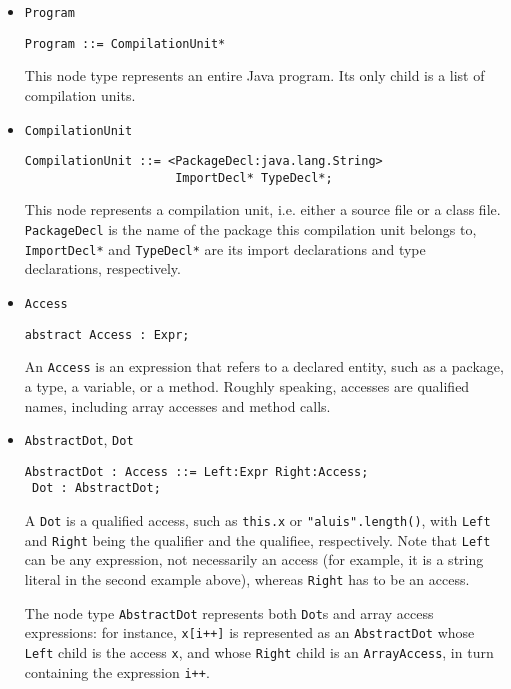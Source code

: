 \documentclass{article}
\newcommand{\nt}[1]{\texttt{#1}}
\newcommand{\child}[1]{\texttt{#1}}
\newcommand{\code}[1]{\lstinline$#1$}
\begin{document}
\begin{itemize}
\item \nt{Program}
  \begin{lstlisting}[frame=single]
 Program ::= CompilationUnit*
  \end{lstlisting}

  This node type represents an entire Java program. Its only child is a list
  of compilation units.
\item \nt{CompilationUnit}
  \begin{lstlisting}[frame=single]
 CompilationUnit ::= <PackageDecl:java.lang.String> 
                     ImportDecl* TypeDecl*;
  \end{lstlisting}

  This node represents a compilation unit, i.e. either a source file or
  a class file. \child{PackageDecl} is the name of the package
  this compilation unit belongs to, \child{ImportDecl*} and \child{TypeDecl*}
  are its import declarations and type declarations, respectively.


\item \nt{Access}
  \begin{lstlisting}[frame=single]
 abstract Access : Expr;
  \end{lstlisting}
  
  An \nt{Access} is an expression that refers to a declared entity, such as
  a package, a type, a variable, or a method. Roughly speaking, accesses are 
  qualified names, including array accesses and method calls.

\item \nt{AbstractDot}, \nt{Dot}
  \begin{lstlisting}[frame=single]
 AbstractDot : Access ::= Left:Expr Right:Access;
 Dot : AbstractDot;
  \end{lstlisting}

  A \nt{Dot} is a qualified access, such as \code{this.x} or
  \code{"aluis".length()}, with \child{Left} and \child{Right} being the
  qualifier and the qualifiee, respectively. Note that \child{Left} can
  be any expression, not necessarily an access (for example, it is
  a string literal in the second example above), whereas \child{Right}
  has to be an access.

  The node type \nt{AbstractDot} represents both \nt{Dot}s and
  array access expressions: for instance, \code{x[i++]} is represented
  as an \nt{AbstractDot} whose \child{Left} child is the access \code{x},
  and whose \child{Right} child is an \nt{ArrayAccess}, in turn containing
  the expression \code{i++}.


\end{itemize}
\end{document}
